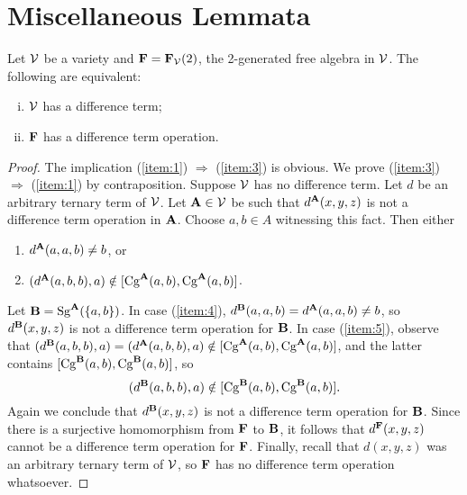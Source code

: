   \newpage

  \appendix

\section{Miscellaneous Lemmata}
\begin{lemma}
  \label{lem:F}
Let $\mathcal{V}$ be a variety and $\mathbf{F} = \mathbf{F}_{\mathcal{V}}(2)$, the 2-generated
free algebra in $\mathcal{V}$. The following are equivalent:
\begin{enumerate}[(i)]
\item \label{item:1}
  $\mathcal{V}$ has a difference term;
\item \label{item:3}
  $\mathbf{F}$ has a difference term operation.
\end{enumerate}
\end{lemma}
\begin{proof}
  The implication
  (\ref{item:1}) $\Rightarrow$ (\ref{item:3}) is
  obvious. We prove
  (\ref{item:3}) $\Rightarrow$  (\ref{item:1}) by contraposition.
  Suppose $\mathcal{V}$ has no difference term.
  Let $d$ be an arbitrary ternary term of $\mathcal{V}$.  Let $\mathbf{A}\in \mathcal{V}$ be such that
  $d^{\mathbf{A}}(x,y,z)$ is not a difference term operation in $\mathbf{A}$.
  Choose $a, b \in A$ witnessing this fact.  Then either
  \begin{enumerate}
  \item\label{item:4} $d^{\mathbf{A}}(a,a,b) \neq b$, or
  \item\label{item:5} $(d^{\mathbf{A}}(a,b,b), a) \notin [\operatorname{Cg}^{\mathbf{A}} (a, b), \operatorname{Cg}^{\mathbf{A}} (a,b)]$.
  \end{enumerate}
  Let $\mathbf{B} = \operatorname{Sg}^{\mathbf{A}} (\{a, b\})$.  In case
  (\ref{item:4}),
  $d^{\mathbf{B}}(a,a,b) = d^{\mathbf{A}}(a,a,b) \neq b$, so $d^{\mathbf{B}}(x,y,z)$ is not a difference
  term operation for $\mathbf{B}$.
  In case (\ref{item:5}), observe that
  $(d^{\mathbf{B}}(a,b,b), a)=(d^{\mathbf{A}}(a,b,b), a)\notin [\operatorname{Cg}^{\mathbf{A}} (a, b), \operatorname{Cg}^{\mathbf{A}} (a,b)]$,
  and the latter contains
  $[\operatorname{Cg}^{\mathbf{B}} (a, b), \operatorname{Cg}^{\mathbf{B}} (a,b)]$, so
  \[(d^{\mathbf{B}}(a,b,b), a) \notin [\operatorname{Cg}^{\mathbf{B}} (a, b), \operatorname{Cg}^{\mathbf{B}} (a,b)].\]
  Again we conclude that $d^{\mathbf{B}}(x,y,z)$ is not a difference term operation for $\mathbf{B}$.
  Since there is a surjective homomorphism from $\mathbf{F}$ to $\mathbf{B}$,
  it follows that $d^{\mathbf{F}}(x,y,z)$ cannot be a difference term operation for $\mathbf{F}$.
  Finally, recall that $d(x,y,z)$ was an arbitrary ternary term of $\mathcal{V}$, so
  $\mathbf{F}$ has no difference term operation whatsoever.
\end{proof}



